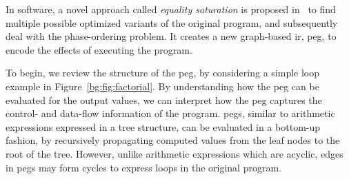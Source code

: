 In software, a novel approach called \emph{equality saturation} is proposed
in~\cite{tate09} to find multiple possible optimized variants of the original
program, and subsequently deal with the phase-ordering problem.  It creates a
new graph-based \gls{ir}, \gls{peg}, to encode the effects of executing the
program.

To begin, we review the structure of the \gls{peg}, by considering a simple
loop example in Figure~\ref{bg:fig:factorial}.  By understanding how the
\gls{peg} can be evaluated for the output values, we can interpret how the
\gls{peg} captures the control- and data-flow information of the program.
\glspl{peg}, similar to arithmetic expressions expressed in a tree structure,
can be evaluated in a bottom-up fashion, by recursively propagating computed
values from the leaf nodes to the root of the tree.  However, unlike arithmetic
expressions which are acyclic, edges in \glspl{peg} may form cycles to express
loops in the original program.
